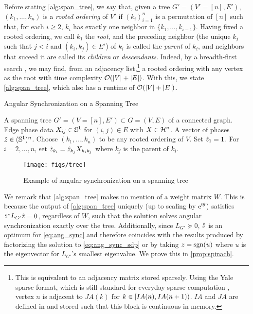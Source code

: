 Before stating \cref{alg:span_tree}, we say that, given a tree $G' = (V' = [n], E')$, $(k_1, \ldots, k_n)$ is a \emph{rooted ordering} of $V'$ if $(k_i)_{i = 1}^n$ is a permutation of $[n]$ such that, for each $i \ge 2$, $k_i$ has exactly one neighbor in $\{k_1, \ldots, k_{i - 1}\}$.  Having fixed a rooted ordering, we call $k_1$ the \emph{root}, and the preceding neighbor (the unique $k_j$ such that $j < i$ and $(k_i, k_j) \in E'$) of $k_i$ is called the \emph{parent} of $k_i$, and neighbors that suceed it are called its \emph{children} or \emph{descendants}.  Indeed, by a breadth-first search \cite{skiena2012algorithmgraph}, we may find, from an adjacency list,\footnote{This is equivalent to an adjacency matrix stored sparsely.  Using the Yale sparse format, which is still standard for everyday sparse computation \cite{bank1993smmp}, vertex $n$ is adjacent to $JA(k)$ for $k \in [IA(n), IA(n+1))$.  $IA$ and $JA$ are defined in \cite{bank1993smmp} and stored such that this block is continuous in memory.} a rooted ordering with any vertex as the root with time complexity $\mathcal{O}(\lvert V\rvert + \lvert E\rvert)$.  With this, we state \cref{alg:span_tree}, which also has a runtime of $\mathcal{O}(\lvert V\rvert + \lvert E\rvert)$.

\begin{algorithm}[htbp]
\renewcommand{\algorithmicrequire}{\textbf{Input:}}
\renewcommand{\algorithmicensure}{\textbf{Output:}}
\caption{Angular Synchronization on a Spanning Tree}
\label{alg:span_tree}
\begin{algorithmic}[1]
    \REQUIRE A spanning tree $G' = (V = [n], E') \subset G = (V, E)$ of a connected graph.  Edge phase data $X_{ij} \in \mathbb{S}^1$ for $(i, j) \in E$ with $X \in \mathcal{H}^n$.
    \ENSURE A vector of phases $\hat{z} \in (\mathbb{S}^1)^n$.
    \STATE Choose $(k_1, \ldots, k_n)$ to be any rooted ordering of $V$.
    \STATE Set $\hat{z}_1 = 1$.
    \STATE For $i = 2, \ldots, n$, set $\hat{z}_{k_i} = \hat{z}_{k_j} X_{k_i k_j}$ where $k_j$ is the parent of $k_i$.
    \end{algorithmic}
\end{algorithm}

\begin{figure}
  \centering
  \texttt{[image: figs/tree]}
  \caption{Example of angular synchronization on a spanning tree}
  \label{fig:tree_example}
\end{figure}

We remark that \cref{alg:span_tree} makes no mention of a weight matrix $W$.  This is because the output of \cref{alg:span_tree} uniquely (up to scaling by $\mathrm{e}^{\mathrm{i} \theta}$) satisfies $\hat{z}^* L_{G'} \hat{z} = 0$, regardless of $W$, such that the solution solves angular synchronization exactly over the tree.  Additionally, since $L_{G'} \succeq 0$, $\hat{z}$ is an optimum for \eqref{eq:ang_sync} and therefore coincides with the results produced by factorizing the solution to \eqref{eq:ang_sync_sdp} or by taking $z = \operatorname{sgn}(u)$ where $u$ is the eigenvector for $L_{G'}$'s smallest eigenvalue.  We prove this in \cref{prop:spinach}.

